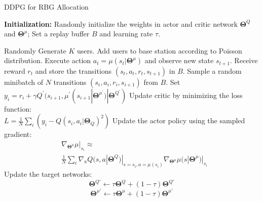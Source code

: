 \documentclass[conference,compsocconf]{IEEEtran}
\begin{document}
\begin{algorithm}
    \caption{DDPG for RBG Allocation}
    \begin{algorithmic}[1]\label{al:1}
        \State \textbf{Initialization:} Randomly initialize the weights in actor and critic network $ \mathbf{\Theta}^Q $ and $\mathbf{\Theta}^{\mu}$;  Set a replay buffer $B$ and learning rate $\tau$.
        
        \State Randomly Generate $K$ users.
        \State Add users to base station according to Poisson distribution.
        \State Execute action $ a_{t}=\mu (s_t|\mathbf{\Theta}^{\mu}) $ and observe new state $ s_{t+1} $.
        \State Receive reward $ r_{t} $ and store the transitions $ (s_{t}, a_{t}, r_{t}, s_{t+1}) $ in $ B $.
        \State Sample a random minibatch of $ N $ transitions $ (s_i, a_i, r_i, s_{i+1}) $ from $ B $.
        \State Set $ y_i = r_i + \gamma Q^{\prime}(s_{i+1}, \mu^{\prime}(s_{i+1}|\mathbf{\Theta}^{\mu^{\prime}})|\mathbf{\Theta}^{Q^{\prime}}) $
        \State Update critic by minimizing the loss function: \\$ L=\frac{1}{N} \sum_{i}(y_i - Q(s_i, a_i|\mathbf{\Theta}_Q)^2)$
        \State Update the actor policy using the sampled gradient:
        $$
        \begin{aligned}
        &\nabla_{\mathbf{\Theta}^{\mu}}\mu|_{s_i}\approx \\ &\frac{1}{N}\sum_i \nabla_{a}Q(s, a|\mathbf{\Theta}^Q)|_{s=s_i,a=\mu(s_i)}\nabla_{\mathbf{\Theta}^{\mu}}\mu(s|\mathbf{\Theta}^{\mu})|_{s_i}
        \end{aligned}
        $$
        \State Update the target networks:
        $$
        \mathbf{\Theta}^{Q \prime} \leftarrow \tau\mathbf{\Theta}^{Q} + (1-\tau)\mathbf{\Theta}^{Q \prime}
        $$
        $$
        \mathbf{\Theta}^{\mu \prime} \leftarrow \tau\mathbf{\Theta}^{\mu} + (1-\tau)\mathbf{\Theta}^{\mu \prime}
        $$
        \EndFor
        \EndFor
    \end{algorithmic}
\end{algorithm}
\end{document}
